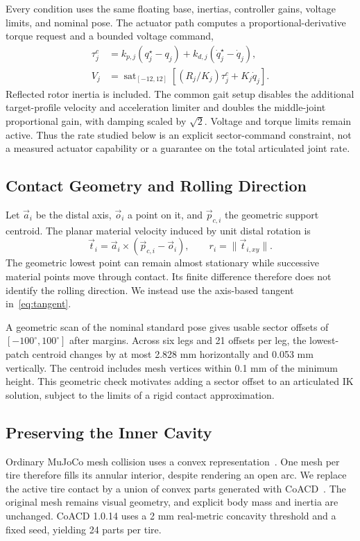\documentclass[letterpaper,10pt,conference]{ieeeconf}
\newcommand{\vct}[1]{\vec{#1}}
\begin{document}
Every condition uses the same floating base, inertias, controller gains, voltage limits, and nominal pose. The actuator path computes a proportional-derivative torque request and a bounded voltage command,
\begin{align}
 \tau_j^c&=k_{p,j}(q_j^\star-q_j)+k_{d,j}(\dot q_j^\star-\dot q_j),\\
 V_j&=\operatorname{sat}_{[-12,12]}[(R_j/K_j)\tau_j^c+K_j\dot q_j].
\end{align}
Reflected rotor inertia is included. The common gait setup disables the additional target-profile velocity and acceleration limiter and doubles the middle-joint proportional gain, with damping scaled by $\sqrt{2}$. Voltage and torque limits remain active. Thus the rate studied below is an explicit sector-command constraint, not a measured actuator capability or a guarantee on the total articulated joint rate.

\subsection{Contact Geometry and Rolling Direction}
Let $\vct{a}_i$ be the distal axis, $\vct{o}_i$ a point on it, and $\vct{p}_{c,i}$ the geometric support centroid. The planar material velocity induced by unit distal rotation is
\begin{equation}
 \vct{t}_i=\vct{a}_i\times(\vct{p}_{c,i}-\vct{o}_i),\qquad
 r_i=\|\vct{t}_{i,xy}\|.\label{eq:tangent}
\end{equation}
The geometric lowest point can remain almost stationary while successive material points move through contact. Its finite difference therefore does not identify the rolling direction. We instead use the axis-based tangent in~\eqref{eq:tangent}.

A geometric scan of the nominal standard pose gives usable sector offsets of $[-100^\circ,100^\circ]$ after margins. Across six legs and 21 offsets per leg, the lowest-patch centroid changes by at most 2.828 mm horizontally and 0.053 mm vertically. The centroid includes mesh vertices within 0.1 mm of the minimum height. This geometric check motivates adding a sector offset to an articulated IK solution, subject to the limits of a rigid contact approximation.

\subsection{Preserving the Inner Cavity}
Ordinary MuJoCo mesh collision uses a convex representation~\cite{mujococollision}. One mesh per tire therefore fills its annular interior, despite rendering an open arc. We replace the active tire contact by a union of convex parts generated with CoACD~\cite{wei2022coacd}. The original mesh remains visual geometry, and explicit body mass and inertia are unchanged. CoACD 1.0.14 uses a 2 mm real-metric concavity threshold and a fixed seed, yielding 24 parts per tire.
\end{document}

